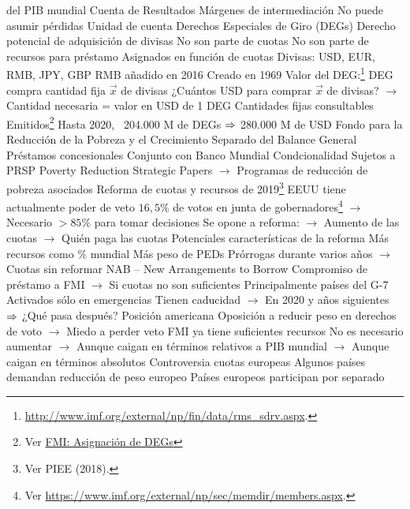 \documentclass{nuevotema}
\begin{document}
\begin{esquemal}
				 del PIB mundial
			\3 Cuenta de Resultados
				\4 Márgenes de intermediación
				\4 No puede asumir pérdidas
			\3 Unidad de cuenta
				\4 Derechos Especiales de Giro (DEGs)
				\4[] Derecho potencial de adquisición de divisas
				\4[] No son parte de cuotas
				\4[] No son parte de recursos para préstamo
				\4[] Asignados en función de cuotas
				\4[] Divisas: USD, EUR, RMB, JPY, GBP
				\4[] RMB añadido en 2016
				\4[] Creado en 1969
				\4 Valor del DEG:\footnote{\url{http://www.imf.org/external/np/fin/data/rms\_sdrv.aspx}.}
				\4[] DEG compra cantidad fija $\vec{x}$ de divisas
				\4[] ¿Cuántos USD para comprar $\vec{x}$ de divisas?
				\4[] $\to$ Cantidad necesaria = valor en USD de 1 DEG
				\4[] Cantidades fijas consultables
				\4 Emitidos\footnote{Ver \href{https://www.imf.org/external/np/fin/tad/extsdr1.aspx}{FMI: Asignación de DEGs}}
				\4[] Hasta 2020, ~204.000 M de DEGs
				\4[] $\Rightarrow$ 280.000 M de USD
			\3 Fondo para la Reducción de la Pobreza y el Crecimiento
				\4 Separado del Balance General
				\4 Préstamos concesionales
				\4 Conjunto con Banco Mundial
				\4 Condcionalidad
				\4 Sujetos a PRSP
				\4[] Poverty Reduction Strategic Papers
				\4[] $\to$ Programas de reducción de pobreza asociados
			\3 Reforma de cuotas y recursos de 2019\footnote{Ver PIEE (2018).}
				\4 EEUU tiene actualmente poder de veto
				\4[] $16,5\%$ de votos en junta de gobernadores\footnote{Ver \url{https://www.imf.org/external/np/sec/memdir/members.aspx}.}
				\4[] $\to$ Necesario $>85\%$ para tomar decisiones
				\4 Se opone a reforma:
				\4[] $\to$ Aumento de las cuotas
				\4[] $\to$ Quién paga las cuotas
				\4 Potenciales características de la reforma
				\4[] Más recursos como \% mundial
				\4[] Más peso de PEDs
				\4 Prórrogas durante varios años
				\4[] $\to$ Cuotas sin reformar
				\4 NAB -- New Arrangements to Borrow
				\4[] Compromiso de préstamo a FMI
				\4[] $\to$ Si cuotas no son suficientes
				\4[] Principalmente países del G-7
				\4[] Activados sólo en emergencias
				\4[] Tienen caducidad
				\4[] $\to$ En 2020 y años siguientes
				\4[] $\Rightarrow$ ¿Qué pasa después?
				\4 Posición americana
				\4[] Oposición a reducir peso en derechos de voto
				\4[] $\to$ Miedo a perder veto
				\4[] FMI ya tiene suficientes recursos
				\4[] No es necesario aumentar
				\4[] $\to$ Aunque caigan en términos relativos a PIB mundial
				\4[] $\to$ Aunque caigan en términos absolutos
				\4 Controversia cuotas europeas
				\4[] Algunos países demandan reducción de peso europeo
				\4[] Países europeos participan por separado

\end{esquemal}
\end{document}
